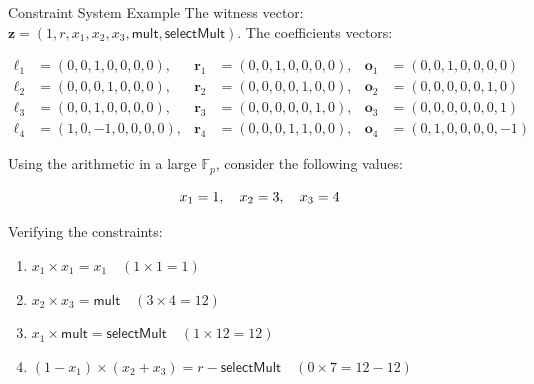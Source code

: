 \documentclass{zkdl-presentation-template}
\begin{document}
    \begin{frame}[fragile]{Constraint System Example}
        The witness vector: $\mathbf{z} = (1, r, x_1, x_2, x_3, \mathsf{mult}, \mathsf{selectMult})$. The coefficients vectors:

        \vspace{-20pt}\small

        \begin{align*}
            \boldsymbol{\ell}_1 &= (0, 0, 1, 0, 0, 0, 0), & \boldsymbol{r}_1 &= (0, 0, 1, 0, 0, 0, 0), & \boldsymbol{o}_1 &= (0, 0, 1, 0, 0, 0, 0) \\
            \boldsymbol{\ell}_2 &= (0, 0, 0, 1, 0, 0, 0), & \boldsymbol{r}_2 &= (0, 0, 0, 0, 1, 0, 0), & \boldsymbol{o}_2 &= (0, 0, 0, 0, 0, 1, 0) \\
            \boldsymbol{\ell}_3 &= (0, 0, 1, 0, 0, 0, 0), & \boldsymbol{r}_3 &= (0, 0, 0, 0, 0, 1, 0), & \boldsymbol{o}_3 &= (0, 0, 0, 0, 0, 0, 1) \\
            \boldsymbol{\ell}_4 &= (1, 0, -1, 0, 0, 0, 0), & \boldsymbol{r}_4 &= (0, 0, 0, 1, 1, 0, 0), & \boldsymbol{o}_4 &= (0, 1, 0, 0, 0, 0, -1)
        \end{align*}\normalsize

        \vspace{-10pt}

        Using the arithmetic in a large $\mathbb{F}_p$, consider the following values:
        
        \vspace{-15pt}
        \begin{equation*}
            x_1 = 1, \quad x_2 = 3, \quad x_3 = 4
            \vspace{-5pt}
        \end{equation*}
    
        Verifying the constraints:
        \begin{enumerate}
            \item \( x_1 \times x_1 = x_1 \quad (1 \times 1 = 1) \)
            \item \( x_2 \times x_3 = \mathsf{mult} \quad (3 \times 4 = 12) \)
            \item \( x_1 \times \mathsf{mult} = \mathsf{selectMult} \quad (1 \times 12 = 12) \)
            \item \( (1 - x_1) \times (x_2 + x_3) = r - \mathsf{selectMult} \quad (0 \times 7 = 12 - 12) \)
        \end{enumerate}
    \end{frame}
\end{document}
